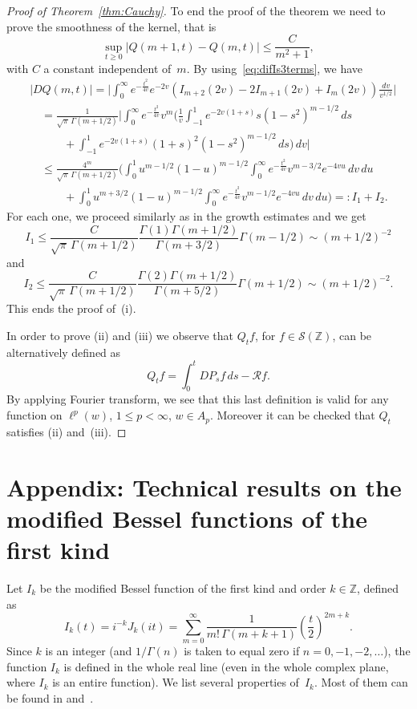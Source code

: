 \documentclass[11pt]{amsart}
\numberwithin{equation}{section}
\newcommand{\Z}{\mathbb{Z}}
\theoremstyle{plain}
\theoremstyle{remark}
\begin{document}
\begin{proof}[Proof of Theorem~\ref{thm:Cauchy}]
To end the proof of the theorem we need to prove the smoothness of the kernel, that is
\[
\sup_{t\ge0} |Q(m+1,t)-Q(m,t)| \le \frac{C}{m^2+1},
\]
with $C$ a constant independent of~$m$.
By using~\eqref{eq:difIs3terms}, we have
\begin{align*}
& |DQ(m,t)| = \bigg|\int_0^{\infty} e^{-\frac{t^2}{4v}}e^{-2v}
(I_{m+2}(2v)-2I_{m+1}(2v)+I_m(2v))
\frac{dv}{v^{1/2}}\bigg| \\
&\quad =\frac{1}{\sqrt{\pi} \,\Gamma(m+1/2)}\bigg|\int_0^{\infty}e^{-\frac{t^2}{4v}}v^m
\bigg(\frac{1}{v}
\int_{-1}^1e^{-2v(1+s)}s(1-s^2)^{m-1/2}\,ds \\
&\qquad\quad +\int_{-1}^1e^{-2v(1+s)}(1+s)^2(1-s^2)^{m-1/2}\,ds\bigg)\,dv\bigg|\\
&\quad\le \frac{4^m}{\sqrt{\pi}\,\Gamma(m+1/2)}\bigg(\int_0^1u^{m-1/2}(1-u)^{m-1/2}
\int_0^{\infty} e^{-\frac{t^2}{4v}}v^{m-3/2}e^{-4vu}\,dv\,du\\
& \qquad\quad +\int_0^1u^{m+3/2}(1-u)^{m-1/2}
\int_0^{\infty} e^{-\frac{t^2}{4v}}v^{m-1/2}e^{-4vu}\,dv\,du\bigg)=:I_1+I_2.
\end{align*}
For each one, we proceed similarly as in the growth estimates and we get
\[
I_1 \le \frac{C}{\sqrt{\pi}\,\Gamma(m+1/2)}
\frac{\Gamma(1)\Gamma(m+1/2)}{\Gamma(m+3/2)}
\Gamma(m-1/2) \sim (m+1/2)^{-2}
\]
and
\[
I_2\le \frac{C}{\sqrt{\pi}\,\Gamma(m+1/2)}
\frac{\Gamma(2)\Gamma(m+1/2)}{\Gamma(m+5/2)}
\Gamma(m+1/2)\sim (m+1/2)^{-2}.
\]
This ends the proof of~(i).

In order to prove (ii) and (iii) we observe that $Q_tf$, for $f \in \mathcal{S}(\Z)$, can be alternatively defined as
\[
Q_tf= \int_0^t DP_sf \, ds - \mathcal{R}f.
\]
By applying Fourier transform, we see that this last definition is valid for any function on $\ell^p(w)$, $1\le p < \infty$, $w\in A_p$. Moreover it can be checked that $Q_t$ satisfies (ii) and~(iii).
\end{proof}

\section{Appendix: Technical results on the modified Bessel functions of the first kind}
\label{sec:preliminaries}

Let $I_k$ be the modified Bessel function of the first kind and order $k\in \Z$, defined as
\begin{equation}
\label{eq:Ik}
  I_k(t) = i^{-k} J_k(it) = \sum_{m=0}^{\infty} \frac{1}{m!\,\Gamma(m+k+1)} \left(\frac{t}{2}\right)^{2m+k}.
\end{equation}
Since $k$ is an integer (and $1/\Gamma(n)$ is taken to equal zero if $n=0,-1,-2,\ldots$), the function $I_k$ is defined in the whole real line (even in the whole complex plane, where $I_k$ is an entire function). We list several properties of~$I_k$. Most of them can be found in \cite[Chapter~5]{Lebedev} and~\cite{OlMax}.
\end{document}
